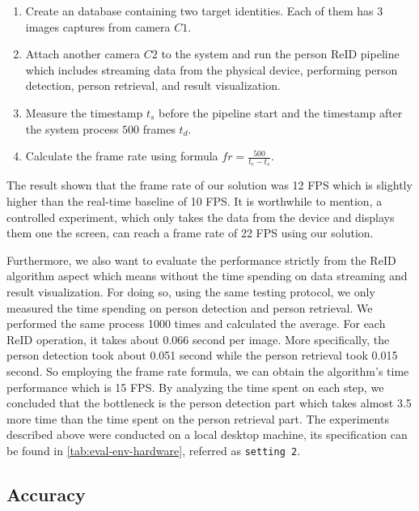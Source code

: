\begin{enumerate}
    \item Create an database containing two target identities. Each of them has
    3 images captures from camera $C1$.
    \item Attach another camera $C2$ to the system and run the person 
    ReID pipeline which includes streaming data from the physical device, 
    performing person detection, person retrieval, and result visualization.
    \item Measure the timestamp $t_s$ before the pipeline start and the 
    timestamp after the system process $500$ frames $t_d$.
    \item Calculate the frame rate using formula 
    $\mathit{fr} = \frac{500}{t_e - t_s}$.
\end{enumerate}

\noindent The result shown that the frame rate of our solution was 12 FPS
which is slightly higher than the real-time baseline of 10 FPS. It is 
worthwhile to mention, a controlled experiment, which only takes the data from 
the device and displays them one the screen, can reach a frame rate of 22 FPS 
using our solution.

Furthermore, we also want to evaluate the performance strictly from the ReID algorithm
aspect which means without the time spending on data streaming and 
result visualization.
For doing so, using the same testing protocol, we only measured the time spending
on person detection and person retrieval. We performed the same process
1000 times and calculated the average. For each ReID operation, it takes
about 0.066 second per image. More specifically, the person detection took
about 0.051 second while the person retrieval took 0.015 second. So employing
the frame rate formula, we can obtain the algorithm's time performance which 
is 15 FPS.
By analyzing the time spent on each step, we concluded that the bottleneck is the
person detection part which takes almost 3.5 more time than the time 
spent on the person retrieval part. The experiments described above were
conducted on a local desktop machine, its specification can be found in
\autoref{tab:eval-env-hardware}, referred as \texttt{setting 2}.

\subsection{Accuracy}
\label{sec:Eval-framework-acc}

